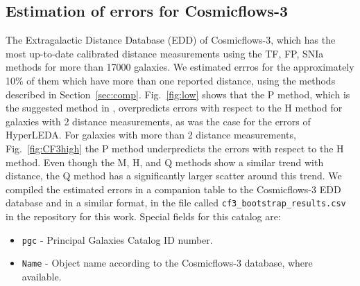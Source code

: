 \documentclass[a4paper,fleqn,usenatbib]{mnras}
\begin{document}
\subsection{Estimation of errors for Cosmicflows-3}
The Extragalactic Distance Database (EDD) of Cosmicflows-3, which has the most up-to-date calibrated distance measurements using the TF, FP, SNIa methods for more than 17000 galaxies. We estimated errros for the approximately 10\% of them which have more than one reported distance, using the methods described in Section~\ref{sec:comp}. Fig.~\ref{fig:low} shows that the P method, which is the suggested method in \citet{cosmicflows}, overpredicts errors with respect to the H method for galaxies with 2 distance measurements, as was the case for the errors of HyperLEDA. For galaxies with more than 2 distance measurements, Fig.~\ref{fig:CF3high} the P method underpredicts the errors with respect to the H method. Even though the M, H, and Q methods show a similar trend with distance, the Q method has a significantly larger scatter around this trend. We compiled the estimated errors in a companion table to the Cosmicflows-3 EDD database and in a similar format, in the file called \texttt{cf3\_bootstrap\_results.csv} in the repository for this work. Special fields for this catalog are:
\begin{itemize}
\item \texttt{pgc} - Principal Galaxies Catalog ID number.
\item \texttt{Name} - Object name according to the Cosmicflows-3 database, where available.
\end{itemize}
\end{document}

